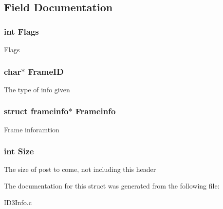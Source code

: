 \subsection{Field Documentation}
\hypertarget{structframe_ac3e60a9fc42fb6c0b656191ebb1d658b}{
\subsubsection[{Flags}]{\setlength{\rightskip}{0pt plus 5cm}int Flags}}\label{structframe_ac3e60a9fc42fb6c0b656191ebb1d658b}
Flags \hypertarget{structframe_a292dfba9fd2b11229258889223baf8b6}{
\subsubsection[{Frame\-I\-D}]{\setlength{\rightskip}{0pt plus 5cm}char$\ast$ Frame\-I\-D}}\label{structframe_a292dfba9fd2b11229258889223baf8b6}
The type of info given \hypertarget{structframe_adcb3be57e379a991d5ee2e4fc382dfd1}{
\subsubsection[{Frameinfo}]{\setlength{\rightskip}{0pt plus 5cm}struct {\bf frameinfo}$\ast$ Frameinfo}}\label{structframe_adcb3be57e379a991d5ee2e4fc382dfd1}
Frame inforamtion \hypertarget{structframe_af06eb7b9b70be91dadd4f12ebcaed796}{
\subsubsection[{Size}]{\setlength{\rightskip}{0pt plus 5cm}int Size}}\label{structframe_af06eb7b9b70be91dadd4f12ebcaed796}
The size of post to come, not including this header 

The documentation for this struct was generated from the following file\-:\begin{DoxyCompactItemize}
\item 
I\-D3\-Info.\-c\end{DoxyCompactItemize}
